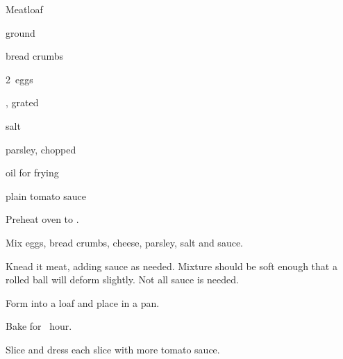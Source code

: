 \begin{recipe}{Meatloaf}{}{}

\begin{ingredients}
\item {} ground 
\item {} bread crumbs
\item 2~eggs
\item {} , grated
\item {} salt
\item parsley, chopped
\item oil for frying
\item plain tomato sauce
\end{ingredients}

\begin{directions}
\item Preheat oven to .
\item Mix eggs, bread crumbs, cheese, parsley, salt and  sauce.
\item Knead it meat, adding sauce as needed. Mixture should be soft enough that a rolled ball will deform slightly. Not all sauce is needed.
\item Form into a loaf and place in a pan.
\item Bake for \half~hour.
\item Slice and dress each slice with more tomato sauce.
\end{directions}
\end{recipe}
